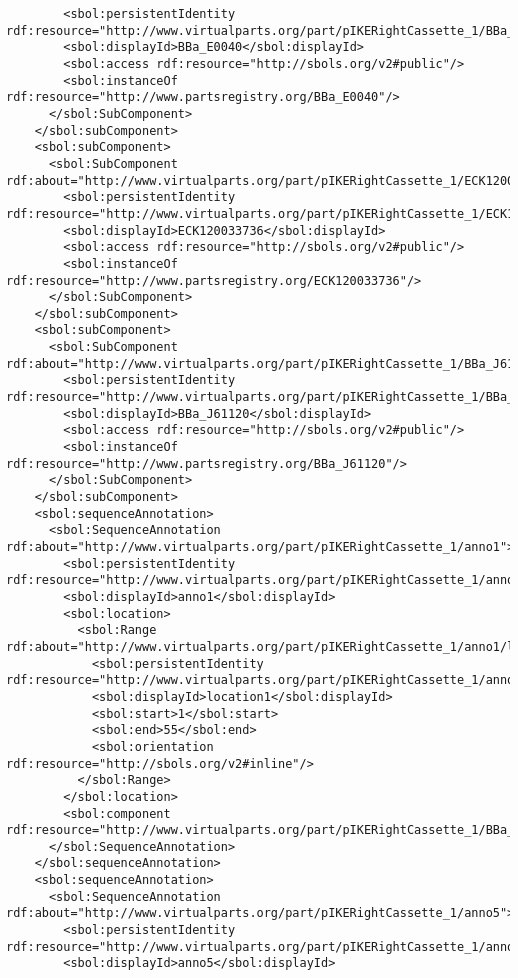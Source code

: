 \begin{lstlisting}
        <sbol:persistentIdentity rdf:resource="http://www.virtualparts.org/part/pIKERightCassette_1/BBa_E0040"/>
        <sbol:displayId>BBa_E0040</sbol:displayId>
        <sbol:access rdf:resource="http://sbols.org/v2#public"/>
        <sbol:instanceOf rdf:resource="http://www.partsregistry.org/BBa_E0040"/>
      </sbol:SubComponent>
    </sbol:subComponent>
    <sbol:subComponent>
      <sbol:SubComponent rdf:about="http://www.virtualparts.org/part/pIKERightCassette_1/ECK120033736">
        <sbol:persistentIdentity rdf:resource="http://www.virtualparts.org/part/pIKERightCassette_1/ECK120033736"/>
        <sbol:displayId>ECK120033736</sbol:displayId>
        <sbol:access rdf:resource="http://sbols.org/v2#public"/>
        <sbol:instanceOf rdf:resource="http://www.partsregistry.org/ECK120033736"/>
      </sbol:SubComponent>
    </sbol:subComponent>
    <sbol:subComponent>
      <sbol:SubComponent rdf:about="http://www.virtualparts.org/part/pIKERightCassette_1/BBa_J61120">
        <sbol:persistentIdentity rdf:resource="http://www.virtualparts.org/part/pIKERightCassette_1/BBa_J61120"/>
        <sbol:displayId>BBa_J61120</sbol:displayId>
        <sbol:access rdf:resource="http://sbols.org/v2#public"/>
        <sbol:instanceOf rdf:resource="http://www.partsregistry.org/BBa_J61120"/>
      </sbol:SubComponent>
    </sbol:subComponent>
    <sbol:sequenceAnnotation>
      <sbol:SequenceAnnotation rdf:about="http://www.virtualparts.org/part/pIKERightCassette_1/anno1">
        <sbol:persistentIdentity rdf:resource="http://www.virtualparts.org/part/pIKERightCassette_1/anno1"/>
        <sbol:displayId>anno1</sbol:displayId>
        <sbol:location>
          <sbol:Range rdf:about="http://www.virtualparts.org/part/pIKERightCassette_1/anno1/location1">
            <sbol:persistentIdentity rdf:resource="http://www.virtualparts.org/part/pIKERightCassette_1/anno1/location1"/>
            <sbol:displayId>location1</sbol:displayId>
            <sbol:start>1</sbol:start>
            <sbol:end>55</sbol:end>
            <sbol:orientation rdf:resource="http://sbols.org/v2#inline"/>
          </sbol:Range>
        </sbol:location>
        <sbol:component rdf:resource="http://www.virtualparts.org/part/pIKERightCassette_1/BBa_R0010"/>
      </sbol:SequenceAnnotation>
    </sbol:sequenceAnnotation>
    <sbol:sequenceAnnotation>
      <sbol:SequenceAnnotation rdf:about="http://www.virtualparts.org/part/pIKERightCassette_1/anno5">
        <sbol:persistentIdentity rdf:resource="http://www.virtualparts.org/part/pIKERightCassette_1/anno5"/>
        <sbol:displayId>anno5</sbol:displayId>

\end{lstlisting}

